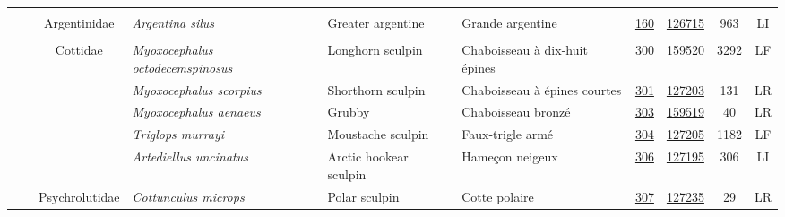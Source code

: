 \documentclass[12pt]{article}\usepackage[]{graphicx}\usepackage[]{color}
\begin{document}
\begin{landscape}
\begin{longtable}[t]{ccc>{\centering\arraybackslash}p{3cm}>{\centering\arraybackslash}p{3cm}>{\centering\arraybackslash}p{3cm}>{}c>{}ccc}
\nopagebreak
\addlinespace[0.3em]
\\
\hspace{1em}\hspace{1em} &  & Argentinidae & \em{Argentina silus} & Greater argentine & Grande argentine & \href{#sec:160}{160} & \href{http://www.marinespecies.org/aphia.php?p=taxdetails&id=126715}{126715} & 963 & LI\\
\nopagebreak
\addlinespace[0.3em]
\\
\hspace{1em}\hspace{1em} &  & Cottidae & \em{Myoxocephalus octodecemspinosus} & Longhorn sculpin & Chaboisseau à dix-huit épines & \href{#sec:300}{300} & \href{http://www.marinespecies.org/aphia.php?p=taxdetails&id=159520}{159520} & 3292 & LF\\
\nopagebreak
\hspace{1em}\hspace{1em} &  &  & \em{Myoxocephalus scorpius} & Shorthorn sculpin & Chaboisseau à épines courtes & \href{#sec:301}{301} & \href{http://www.marinespecies.org/aphia.php?p=taxdetails&id=127203}{127203} & 131 & LR\\
\nopagebreak
\hspace{1em}\hspace{1em} &  &  & \em{Myoxocephalus aenaeus} & Grubby & Chaboisseau bronzé & \href{#sec:303}{303} & \href{http://www.marinespecies.org/aphia.php?p=taxdetails&id=159519}{159519} & 40 & LR\\
\nopagebreak
\hspace{1em}\hspace{1em} &  &  & \em{Triglops murrayi} & Moustache sculpin & Faux-trigle armé & \href{#sec:304}{304} & \href{http://www.marinespecies.org/aphia.php?p=taxdetails&id=127205}{127205} & 1182 & LF\\
\nopagebreak
\hspace{1em}\hspace{1em} &  &  & \em{Artediellus uncinatus} & Arctic hookear sculpin & Hameçon neigeux & \href{#sec:306}{306} & \href{http://www.marinespecies.org/aphia.php?p=taxdetails&id=127195}{127195} & 306 & LI\\
\nopagebreak
\hspace{1em}\hspace{1em} &  & Psychrolutidae & \em{Cottunculus microps} & Polar sculpin & Cotte polaire & \href{#sec:307}{307} & \href{http://www.marinespecies.org/aphia.php?p=taxdetails&id=127235}{127235} & 29 & LR\\

\end{longtable}
\end{landscape}
\end{document}
